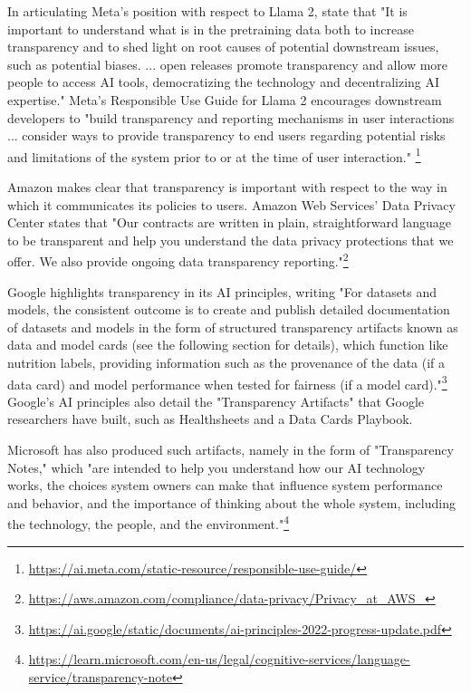 In articulating Meta's position with respect to Llama 2, \citet{touvron2023llama} state that "It is important to understand what is in the pretraining data both to increase transparency and to shed light on root causes of potential downstream issues, such as potential biases. ... open releases promote transparency and allow more people to access AI tools, democratizing the technology and decentralizing AI expertise." Meta's Responsible Use Guide for Llama 2 encourages downstream developers to "build transparency and reporting mechanisms in user interactions ... consider ways to provide transparency to end users regarding potential risks and limitations of the system prior to or at the time of user interaction."
\footnote{\url{https://ai.meta.com/static-resource/responsible-use-guide/}} 

Amazon makes clear that transparency is important with respect to the way in which it communicates its policies to users.
Amazon Web Services' Data Privacy Center states that "Our contracts are written in plain, straightforward language to be transparent and help you understand the data privacy protections that we offer. We also provide ongoing data transparency reporting."\footnote{\url{https://aws.amazon.com/compliance/data-privacy/Privacy_at_AWS_}} 

Google highlights transparency in its AI principles, writing "For datasets and models, the consistent outcome is to create and publish detailed documentation of datasets and models in the form of structured transparency artifacts known as data and model cards (see the following section for details), which function like nutrition labels, providing information such as the provenance of the data (if a data card) and model performance when tested for fairness (if a model card)."\footnote{\url{https://ai.google/static/documents/ai-principles-2022-progress-update.pdf}} 
Google's AI principles also detail the "Transparency Artifacts" that Google researchers have built, such as Healthsheets and a Data Cards Playbook.

Microsoft has also produced such artifacts, namely in the form of "Transparency Notes," which "are intended to help you understand how our AI technology works, the choices system owners can make that influence system performance and behavior, and the importance of thinking about the whole system, including the technology, the people, and the environment."\footnote{\url{https://learn.microsoft.com/en-us/legal/cognitive-services/language-service/transparency-note}} 

